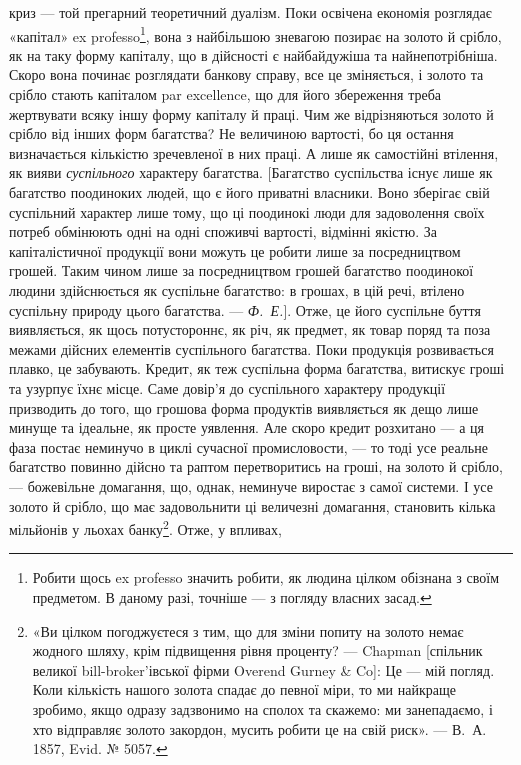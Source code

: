 \parcont{}  %
криз — той прегарний теоретичний дуалізм. Поки освічена економія розглядає
«капітал» ex professo\footnote{Робити щось ex professo значить робити, як людина цілком обізнана з своїм предметом. В даному
разі, точніше — з погляду власних засад. }, вона з найбільшою зневагою позирає на золото й срібло,
як на таку форму капіталу, що в дійсності є найбайдужіша та найнепотрібніша.
Скоро вона починає розглядати банкову справу, все це зміняється, і золото та
срібло стають капіталом par excellence, що для його збереження треба жертвувати
всяку іншу форму капіталу й праці. Чим же відрізняються золото й
срібло від інших форм багатства? Не величиною вартості, бо ця остання визначається
кількістю зречевленої в них праці. А лише як самостійні втілення, як вияви
\emph{суспільного} характеру багатства. [Багатство суспільства існує лише як багатство
поодиноких людей, що є його приватні власники. Воно зберігає свій суспільний
характер лише тому, що ці поодинокі люди для задоволення своїх потреб
обмінюють одні на одні споживчі вартості, відмінні якістю. За капіталістичної
продукції вони можуть це робити лише за посредництвом грошей. Таким
чином лише за посредництвом грошей багатство поодинокої людини здійснюється як
суспільне багатство: в грошах, в цій речі, втілено суспільну природу цього багатства.
— \emph{Ф.~Е.}]. Отже, це його суспільне буття виявляється, як щось потустороннє,
як річ, як предмет, як товар поряд та поза межами дійсних елементів суспільного
багатства. Поки продукція розвивається плавко, це забувають. Кредит, як теж
суспільна форма багатства, витискує гроші та узурпує їхнє місце. Саме довір’я
до суспільного характеру продукції призводить до того, що грошова форма продуктів
виявляється як дещо лише минуще та ідеальне, як просте уявлення. Але
скоро кредит розхитано — а ця фаза постає неминучо в циклі сучасної промисловости,
— то тоді усе реальне багатство повинно дійсно та раптом перетворитись
на гроші, на золото й срібло, — божевільне домагання, що, однак, неминуче виростає
з самої системи. І усе золото й срібло, що має задовольнити ці величезні
домагання, становить кілька мільйонів у льохах банку\footnote{
«Ви цілком погоджуєтеся з тим, що для зміни попиту на золото немає жодного шляху, крім
підвищення
рівня проценту? — Chapman [спільник великої bill-broker’івської фірми Overend Gurney \& Co]:
Це — мій погляд. Коли кількість нашого золота спадає до певної міри, то ми найкраще зробимо, якщо
одразу задзвонимо на сполох та скажемо: ми занепадаємо, і хто відправляє золото закордон, мусить
робити це на свій риск». — В.~А. 1857, Evid. № 5057.
}. Отже, у впливах,
